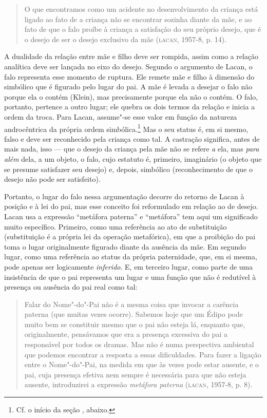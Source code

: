 \begin{quote}
O que encontramos como um acidente no desenvolvimento da criança está
ligado ao fato de a criança não se encontrar sozinha diante da mãe, e ao
fato de que o falo proíbe à criança a satisfação do seu próprio desejo,
que é o desejo de ser o desejo exclusivo da mãe (\textsc{lacan}, 1957-8, p. 14).
\end{quote}

A dualidade da relação entre mãe e filho deve ser rompida, assim como a
relação analítica deve ser lançada no eixo do desejo. Segundo o
argumento de Lacan, o falo representa esse momento de ruptura. Ele
remete mãe e filho à dimensão do simbólico que é figurado pelo lugar do
pai. A mãe é levada a desejar o falo não porque ela o contém (Klein),
mas precisamente porque ela não o contém. O falo, portanto, pertence a
outro lugar; ele quebra os dois termos da relação e inicia a ordem da
troca. Para Lacan, assume"-se esse valor em função da natureza
androcêntrica da própria ordem simbólica.\footnote{Cf. o início da seção
  , abaixo.} Mas o seu status é, em si mesmo, falso e deve ser
reconhecido pela criança como tal. A castração significa, antes de mais
nada, isso --- que o desejo da criança pela mãe não se refere \emph{a}
ela, mas \emph{para} \emph{além} dela, a um objeto, o falo, cujo
estatuto é, primeiro, imaginário (o objeto que se presume satisfazer seu
desejo) e, depois, simbólico (reconhecimento de que o desejo não pode
ser satisfeito).

Portanto, o lugar do falo nessa argumentação decorre do retorno de Lacan
à posição e à lei do pai, mas esse conceito foi reformulado em relação
ao de desejo. Lacan usa a expressão ``metáfora paterna'' e ``metáfora''
tem aqui um significado muito específico. Primeiro, como uma referência
ao ato de substituição (substituição é a própria lei da operação
metafórica), em que a proibição do pai toma o lugar originalmente
figurado diante da ausência da mãe. Em segundo lugar, como uma
referência ao status da própria paternidade, que, em si mesma, pode
apenas ser logicamente \emph{inferido}. E, em terceiro lugar, como parte
de uma insistência de que o pai representa um lugar e uma função que não
é redutível à presença ou ausência do pai real como tal:

\begin{quote}
Falar do Nome"-do"-Pai não é a mesma coisa que invocar a carência paterna
(que muitas vezes ocorre). Sabemos hoje que um Édipo pode muito bem se
constituir mesmo que o pai não esteja lá, enquanto que, originalmente,
pensávamos que era a presença excessiva do pai a responsável por todos
os dramas. Mas não é numa perspectiva ambiental que podemos encontrar a
resposta a essas dificuldades. Para fazer a ligação entre o Nome"-do"-Pai,
na medida em que às vezes pode estar ausente, e o pai, cuja presença
efetiva nem sempre é necessária para que não esteja ausente,
introduzirei a expressão \emph{metáfora paterna} (\textsc{lacan}, 1957-8, p. 8).
\end{quote}

